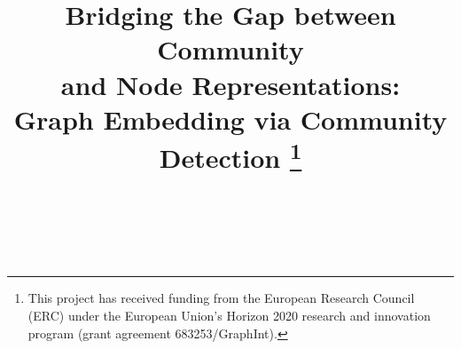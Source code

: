 \documentclass[conference]{IEEEtran}
\newcommand{\anm}{ANONYMIZED\xspace}
\begin{document}

\title{Bridging the Gap between Community\\ and Node Representations:\\ Graph Embedding via Community Detection
\thanks{This project has received funding from the European Research Council (ERC) under the European Union's Horizon 2020 research and innovation program (grant agreement 683253/GraphInt).}
}

\ifdefined\ANONYMOUS
\author{\IEEEauthorblockN{\anm}
\\
\\
}
\else
\author{  
\and
{}  
\and
{}  
}
\fi

\maketitle
\end{document}

